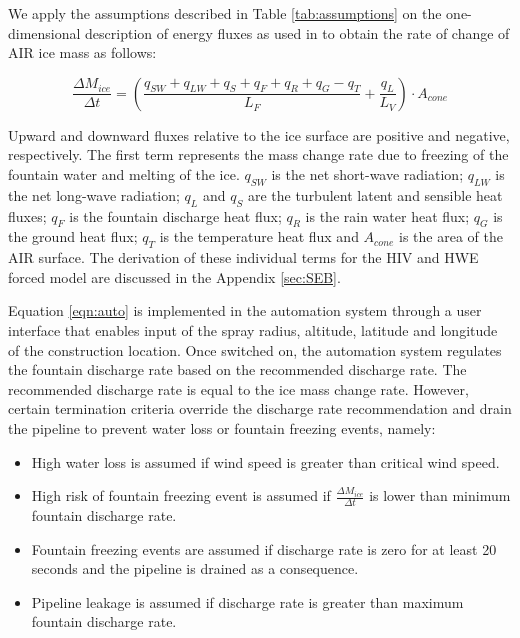 \documentclass[tc, manuscript]{copernicus}
\begin{document}
We apply the assumptions described in Table \ref{tab:assumptions} on the one-dimensional description of energy
fluxes as used in \cite{balasubramanianInfluenceMeteorologicalConditions2022} to obtain the rate of change of
AIR ice mass as follows: 

\begin{equation}
  \frac{\Delta M_{ice}}{\Delta t}  =  (\frac{q_{SW} + q_{LW} + q_{S} + q_{F} + q_{R} + q_{G} - q_{T}}{L_F} + \frac{q_{L}}{L_V} ) \cdot A_{cone}
	\label{eqn:auto}
\end{equation}

Upward and downward fluxes relative to the ice surface are positive and negative, respectively. The first term
represents the mass change rate due to freezing of the fountain water and melting of the ice. $q_{SW}$ is the
net short-wave radiation; $q_{LW}$ is the net long-wave radiation; $q_{L}$ and $q_{S}$ are the turbulent latent
and sensible heat fluxes; $q_{F}$ is the fountain discharge heat flux; $q_{R}$ is the rain water heat flux;
$q_{G}$ is the ground heat flux; $q_{T}$ is the temperature heat flux and $A_{cone}$ is the area of the AIR
surface. The derivation of these individual terms for the HIV and HWE forced model are discussed in the
Appendix \ref{sec:SEB}.

Equation \ref{eqn:auto} is implemented in the automation system through a user interface that enables input of
the spray radius, altitude, latitude and longitude of the construction location. Once switched on, the
automation system regulates the fountain discharge rate based on the recommended discharge rate. The recommended
discharge rate is equal to the ice mass change rate. However, certain termination criteria override the
discharge rate recommendation and drain the pipeline to prevent water loss or fountain freezing events, namely: 

\begin{itemize}

\item High water loss is assumed if wind speed is greater than critical wind speed.

\item High risk of fountain freezing event is assumed if $\frac{\Delta M_{ice}}{\Delta t}$ is lower than minimum fountain discharge rate. 

\item Fountain freezing events are assumed if discharge rate is zero for at least 20 seconds and the pipeline is drained as a
  consequence.

\item Pipeline leakage is assumed if discharge rate is greater than maximum fountain discharge rate.

\end{itemize}
\end{document}

